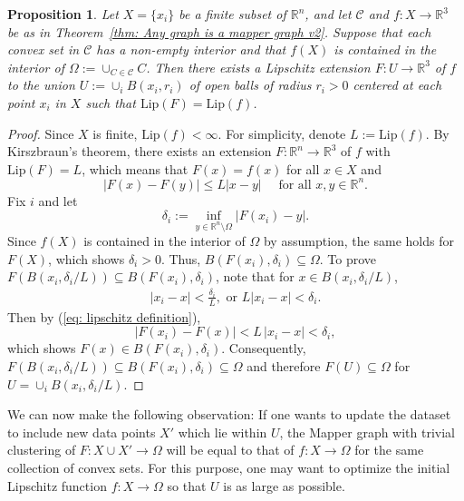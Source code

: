 \documentclass[reqno,oneside,11pt]{amsart}
\newtheorem{prop}[theorem]{Proposition}
\theoremstyle{definition}
\theoremstyle{remark}
\def\R{\mathbb{R}}
\begin{document}
%
%
%
%
%
%
%

\begin{prop}\label{prop lipschitz extensions}
Let $X = \{x_i\}$ be a finite subset of $\R^n$, and let $\mathcal{C}$ and $f \colon X \to \mathbb{R}^3$ be as in Theorem~\ref{thm: Any graph is a mapper graph v2}. Suppose that each convex set in $\mathcal{C}$ has a non-empty interior and that $f(X)$ is contained in the interior of $\Omega:= \cup_{C \in \mathcal{C}} C$. Then there exists a Lipschitz extension $F: U \to \mathbb{R}^3$ of $f$ to the union $U := \cup_i B(x_i, r_i)$ of open balls of radius $r_i > 0$ centered at each point $x_i$ in $X$ such that $\mathrm{Lip}(F) = \mathrm{Lip}(f)$. %
\end{prop}

\begin{proof}
Since $X$ is finite, $\mathrm{Lip}(f) < \infty$.
%
%
%
%
%
%
For simplicity, denote $L:=\mathrm{Lip}(f)$. By Kirszbraun's theorem, there exists an extension $F \colon \R^n \to \R^3$ of $f$ with $\mathrm{Lip}(F) = L$, which means that $F(x) = f(x)$ for all $x\in X$ and
\begin{equation}\label{eq: lipschitz definition}
|F(x) - F(y)| \leq L|x - y| \quad \text{ for all } x, y \in \R^n.
\end{equation}
Fix $i$ and let
\[
\delta_i := \inf_{y \in \R^n\setminus \Omega} |F(x_i) - y|.
\]
Since $f(X)$ is contained in the interior of $\Omega$ by assumption, the same holds for $F(X)$, which shows $\delta_i>0$. Thus, $B(F(x_i), \delta_i) \subseteq \Omega$. 
%
To prove $F(B(x_i, \delta_i/L)) \subseteq B(F(x_i), \delta_i)$, note that for $x \in B(x_i, \delta_i/L)$,
\begin{align*}
    |x_i-x|<\frac{\delta_i}{L}, \mbox{ or }
    L|x_i-x|<\delta_i.
\end{align*}
Then by (\ref{eq: lipschitz definition}),
\[
|F(x_i)-F(x)|<L\, |x_i-x|<\delta_i,
\]
which shows $F(x) \in B(F(x_i), \delta_i)$. Consequently, $F(B(x_i, \delta_i/L)) \subseteq B(F(x_i), \delta_i) \subseteq \Omega$ and
therefore $F(U)\subseteq \Omega$ for $U = \cup_i B(x_i, \delta_i/L)$.
\end{proof}
We can now make the following observation: 
If one wants to update the dataset to include new data points $X'$ which lie within $U$, the Mapper graph with trivial clustering of $F \colon X \cup X' \to \Omega$ will be equal to that of $f \colon X \to \Omega$ for the same collection of convex sets.
For this purpose, one may want to optimize the initial Lipschitz function $f \colon X \to \Omega$ so that $U$ is as large as possible. %
\end{document}
